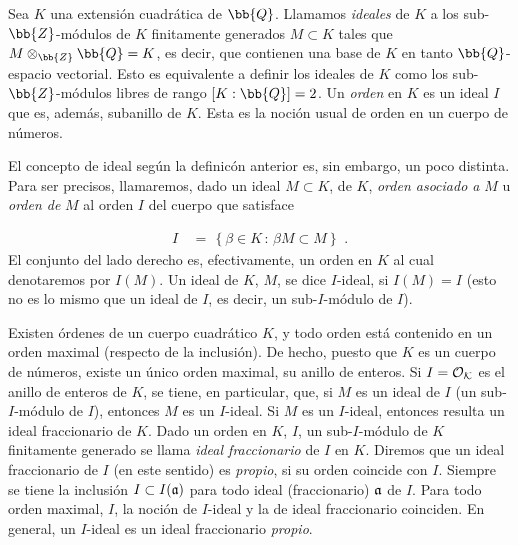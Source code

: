 
Sea $K$ una extensi\'{o}n cuadr\'{a}tica de $\bb{Q}$. Llamamos
\emph{ideales} de $K$ a los sub-$\bb{Z}$-m\'{o}dulos de $K$ finitamente
generados $M\subset K$ tales que $M\otimes_{\bb{Z}}\bb{Q}=K$, es decir,
que contienen una base de $K$ en tanto $\bb{Q}$-espacio vectorial.
Esto es equivalente a definir los ideales de $K$ como los
sub-$\bb{Z}$-m\'{o}dulos libres de rango $[K:\bb{Q}]=2$. Un
\emph{orden} en $K$ es un ideal $I$ que es, adem\'{a}s, subanillo de
$K$.
Esta es la noci\'{o}n usual de orden en un cuerpo de n\'{u}meros.

El concepto de ideal seg\'{u}n la definic\'{o}n anterior es, sin
embargo, un poco distinta. Para ser precisos, llamaremos, dado un
ideal $M\subset K$, de $K$, \emph{orden asociado a} $M$ u
\emph{orden de} $M$ al orden $I$ del cuerpo que satisface

\begin{align*}
I & \,=\,\left\lbrace \beta\in K\,:\,\beta M\subset M \right\rbrace
\text{ .}
\end{align*}
El conjunto del lado derecho es, efectivamente, un orden en $K$ al cual
denotaremos por $I(M)$. Un ideal de $K$, $M$, se dice $I$-ideal, si
$I(M)=I$ (esto no es lo mismo que un ideal de $I$, es decir, un
sub-$I$-m\'{o}dulo de $I$).

Existen \'{o}rdenes de un cuerpo cuadr\'{a}tico $K$, y todo orden
est\'{a} contenido en un orden maximal (respecto de la inclusi\'{o}n).
De hecho, puesto que $K$ es un cuerpo de n\'{u}meros, existe un
\'{u}nico orden maximal, su anillo de enteros.
Si $I=\cal{O}_{K}$ es el anillo de enteros de $K$, se tiene, en particular, que, si $M$ es un ideal de $I$
(un sub-$I$-m\'{o}dulo de $I$), entonces $M$ es un $I$-ideal.
Si $M$ es un $I$-ideal, entonces resulta un ideal fraccionario de $K$.
Dado un orden en $K$, $I$, un sub-$I$-m\'{o}dulo de $K$ finitamente
generado se llama \emph{ideal fraccionario} de $I$ en $K$.
Diremos que un ideal fraccionario de $I$ (en este sentido) es
\emph{propio}, si su orden coincide con $I$. Siempre se tiene
la inclusi\'{o}n $I\subset I(\frak{a})$ para todo ideal
(fraccionario) $\frak{a}$ de $I$. Para todo orden maximal, $I$, la
noci\'{o}n de $I$-ideal y la de ideal fraccionario coinciden.
En general, un $I$-ideal es un ideal fraccionario \emph{propio}.

